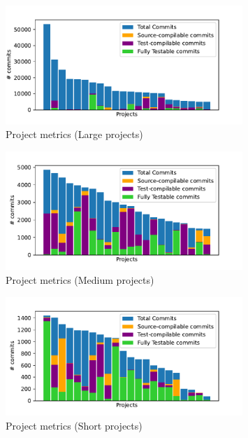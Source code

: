 \begin{figure}[h!]
    \centering    
    \includegraphics[width=0.8\textwidth]{pages/02-Testability/images/Many4j 1-22.pdf}
    \caption{Project metrics (Large projects)}
    \label{fig:many4j-1-bar-chart}
\end{figure}%
\begin{figure}[h!]
    \centering    
    \includegraphics[width=0.8\textwidth]{pages/02-Testability/images/Many4j 23-44.pdf}
    \caption{Project metrics (Medium projects)}
    \label{fig:many4j-2-bar-chart}
\end{figure} 
\begin{figure}[h!]
    \centering    
    \includegraphics[width=0.8\textwidth]{pages/02-Testability/images/Many4j 45-66.pdf}
    \caption{Project metrics (Short projects)}
    \label{fig:many4j-3-bar-chart}
\end{figure}
